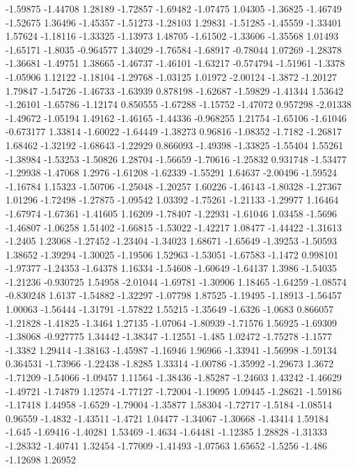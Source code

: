 \documentclass[9pt]{article}
\theoremstyle{plain}
\theoremstyle{definition}
\theoremstyle{remark}
\numberwithin{equation}{section}
\begin{document}
-1.59875
-1.44708
1.28189
-1.72857
-1.69482
-1.07475
1.04305
-1.36825
-1.46749
-1.52675
1.36496
-1.45357
-1.51273
-1.28103
1.29831
-1.51285
-1.45559
-1.33401
1.57624
-1.18116
-1.33325
-1.13973
1.48705
-1.61502
-1.33606
-1.35568
1.01493
-1.65171
-1.8035
-0.964577
1.34029
-1.76584
-1.68917
-0.78044
1.07269
-1.28378
-1.36681
-1.49751
1.38665
-1.46737
-1.46101
-1.63217
-0.574794
-1.51961
-1.3378
-1.05906
1.12122
-1.18104
-1.29768
-1.03125
1.01972
-2.00124
-1.3872
-1.20127
1.79847
-1.54726
-1.46733
-1.63939
0.878198
-1.62687
-1.59829
-1.41344
1.53642
-1.26101
-1.65786
-1.12174
0.850555
-1.67288
-1.15752
-1.47072
0.957298
-2.01338
-1.49672
-1.05194
1.49162
-1.46165
-1.44336
-0.968255
1.21754
-1.65106
-1.61046
-0.673177
1.33814
-1.60022
-1.64449
-1.38273
0.96816
-1.08352
-1.7182
-1.26817
1.68462
-1.32192
-1.68643
-1.22929
0.866093
-1.49398
-1.33825
-1.55404
1.55261
-1.38984
-1.53253
-1.50826
1.28704
-1.56659
-1.70616
-1.25832
0.931748
-1.53477
-1.29938
-1.47068
1.2976
-1.61208
-1.62339
-1.55291
1.64637
-2.00496
-1.59524
-1.16784
1.15323
-1.50706
-1.25048
-1.20257
1.60226
-1.46143
-1.80328
-1.27367
1.01296
-1.72498
-1.27875
-1.09542
1.03392
-1.75261
-1.21133
-1.29977
1.16464
-1.67974
-1.67361
-1.41605
1.16209
-1.78407
-1.22931
-1.61046
1.03458
-1.5696
-1.46807
-1.06258
1.51402
-1.66815
-1.53022
-1.42217
1.08477
-1.44422
-1.31613
-1.2405
1.23068
-1.27452
-1.23404
-1.34023
1.68671
-1.65649
-1.39253
-1.50593
1.38652
-1.39294
-1.30025
-1.19506
1.52963
-1.53051
-1.67583
-1.1472
0.998101
-1.97377
-1.24353
-1.64378
1.16334
-1.54608
-1.60649
-1.64137
1.3986
-1.54035
-1.21236
-0.930725
1.54958
-2.01044
-1.69781
-1.30906
1.18465
-1.64259
-1.08574
-0.830248
1.6137
-1.54882
-1.32297
-1.07798
1.87525
-1.19495
-1.18913
-1.56457
1.00063
-1.56444
-1.31791
-1.57822
1.55215
-1.35649
-1.6326
-1.0683
0.866057
-1.21828
-1.41825
-1.3464
1.27135
-1.07064
-1.80939
-1.71576
1.56925
-1.69309
-1.38068
-0.927775
1.34442
-1.38347
-1.12551
-1.485
1.02472
-1.75278
-1.1577
-1.3382
1.29414
-1.38163
-1.45987
-1.16946
1.96966
-1.33941
-1.56998
-1.59134
0.364531
-1.73966
-1.22438
-1.8285
1.33314
-1.00786
-1.35992
-1.29673
1.3672
-1.71209
-1.54066
-1.09457
1.11564
-1.38436
-1.85287
-1.24603
1.43242
-1.46629
-1.49721
-1.74879
1.12574
-1.77127
-1.72004
-1.19095
1.09445
-1.28621
-1.59186
-1.17418
1.44958
-1.6529
-1.79004
-1.35877
1.58304
-1.72717
-1.5184
-1.08514
0.96559
-1.4832
-1.43511
-1.4721
1.04477
-1.34067
-1.30668
-1.43414
1.59184
-1.645
-1.69416
-1.40281
1.53469
-1.4634
-1.64481
-1.12385
1.28828
-1.31333
-1.28332
-1.40741
1.32454
-1.77009
-1.41493
-1.07563
1.65652
-1.5256
-1.486
-1.12698
1.26952
\end{document}
